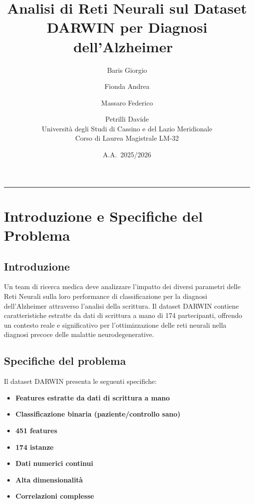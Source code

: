 \documentclass[11pt,a4paper]{article}
\title{
  \vspace{-1cm}
  {\Large \textbf{Analisi di Reti Neurali sul Dataset DARWIN per Diagnosi dell'Alzheimer}}\
}
\author{Baris Giorgio \and Fionda Andrea \and Massaro Federico \and Petrilli Davide \\ [0.5cm]
  \small Università degli Studi di Cassino e del Lazio Meridionale\\
  \small Corso di Laurea Magistrale LM-32
}
\date{A.A.\ 2025/2026}
\begin{document}
\maketitle
\thispagestyle{fancy}
\tableofcontents
\vspace{0.4cm}
\rule{\linewidth}{0.3pt}
\bigskip

\section{Introduzione e Specifiche del Problema}

\subsection{Introduzione}
Un team di ricerca medica deve analizzare l'impatto dei diversi parametri delle Reti Neurali sulla loro performance di classificazione 
per la diagnosi dell'Alzheimer attraverso l'analisi della scrittura. Il dataset DARWIN contiene caratteristiche estratte da dati di scrittura 
a mano di 174 partecipanti, offrendo un contesto reale e significativo per l'ottimizzazione delle reti neurali nella diagnosi precoce 
delle malattie neurodegenerative.
\subsection{Specifiche del problema}

Il dataset DARWIN presenta le seguenti specifiche:
\begin{itemize}
  \item \textbf{Features estratte da dati di scrittura a mano}
  \item \textbf{Classificazione binaria (paziente/controllo sano)}
  \item \textbf{451 features}
  \item \textbf{174 istanze}
  \item \textbf{Dati numerici continui}
  \item \textbf{Alta dimensionalità}
  \item \textbf{Correlazioni complesse}
\end{itemize}
\end{document}
